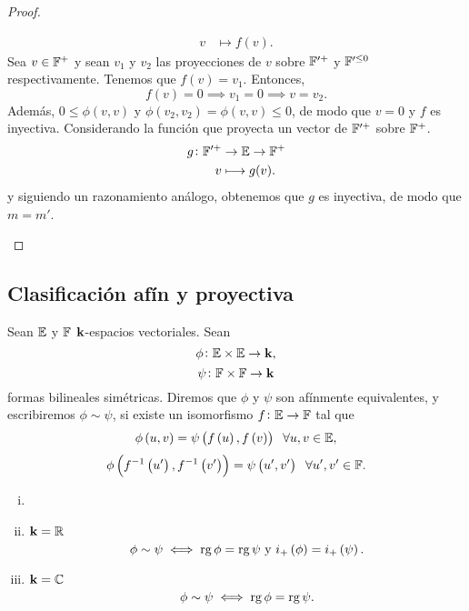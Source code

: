 \begin{proof}
\begin{enumerate}[i)]
\[\begin{aligned}
                    v &\longmapsto f(v).
                \end{aligned}
            \]
            Sea $v\in \mathbb{F}^+$ y sean $v_1$ y $v_2$ las proyecciones de $v$
            sobre $\mathbb{F}^{\prime+}$ y $\mathbb{F}^{\prime \leq 0}$ respectivamente.
            Tenemos que $f(v)=v_1$. Entonces, 
            \[
            	f(v)=0 \implies v_1=0 \implies v=v_2.
            \]
            Además, $0\leq \phi \left( v, v \right)$ y $\phi \left( v_2 , v_2 \right)=
             \phi \left( v, v \right) \leq 0$, de modo que $v=0$ y $f$ es inyectiva.
            Considerando la función que proyecta un vector de $\mathbb{F}^{\prime+}$ sobre $\mathbb{F}^{+}$.
            \[
                \begin{aligned}
                    g \colon \mathbb{F}^{\prime +} &\to \mathbb{E} \to \mathbb{F}^{+} \\
                    v &\longmapsto g(v).
                \end{aligned}
            \]
            y siguiendo un razonamiento análogo, obtenemos que $g$ es inyectiva, 
            de modo que $m=m'$.
    \end{enumerate}
        
    
    
\end{proof}
\subsection{Clasificación afín y proyectiva}
\begin{defi}
	Sean $\mathbb{E}$ y $\mathbb{F}$ $\mathbf{k}$-espacios vectoriales. Sean
	\[
		\phi \colon \mathbb{E} \times \mathbb{E} \to \mathbf{k},
	\]
	\[
		\psi \colon \mathbb{F} \times \mathbb{F} \to \mathbf{k}
	\]
formas bilineales simétricas. Diremos que $\phi$ y
$\psi$ son afínmente equivalentes, y escribiremos 
$\phi \sim \psi$, si existe un isomorfismo $f \colon \mathbb{E} \to \mathbb{F}$ tal que
\[
	\phi \left(u, v \right) = \psi \left( f \left( u \right) , 
	f \left( v \right)  \right) \hspace{0,2cm} \forall u, v \in \E,
\]
\[
	\phi \left( f ^{-1} \left( u ' \right) ,  f ^{-1} \left( v ' \right) 
	\right) = \psi \left( u' , v' \right) \hspace{0,2cm} \forall
	u', v' \in \F.
\]
\end{defi}
\begin{thm}[de Sylvester]
    \begin{enumerate}[i)]
        \item[]
        \item $\mathbf{k}=\mathbb{R}$
        \[
            \phi \sim \psi \iff \operatorname{rg} \phi = \operatorname{rg} \psi \text{ y }
            i_+\left( \phi \right) = i_+\left( \psi \right).
        \]
        \item $\mathbf{k}=\mathbb{C}$
        \[
            \phi \sim \psi \iff \operatorname{rg} \phi = \operatorname{rg} \psi.
        \]
    \end{enumerate}

\end{thm}
